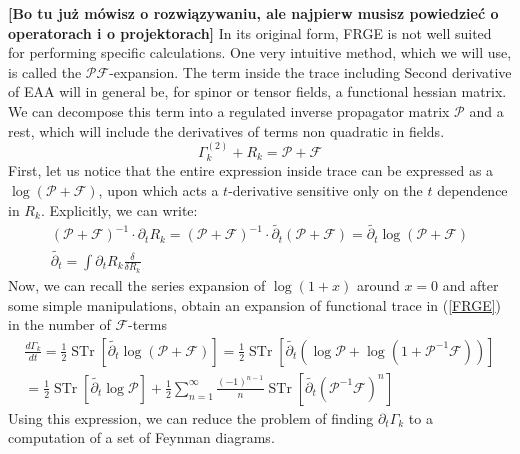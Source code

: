 \documentclass[11pt, a4paper]{article}
\newcommand{\jhkbf}[1]{\textbf{\color{red} [#1]}}
\begin{document}
\jhkbf{Bo tu już mówisz o rozwiązywaniu, ale najpierw musisz powiedzieć o operatorach i o projektorach}
In its original form, FRGE is not well suited for performing specific calculations. One very intuitive method, which
we will use, is called the $\mathcal{PF}$-expansion. 
The term inside the trace including Second derivative of EAA
will in general be, for spinor or tensor fields, a functional hessian matrix. We can decompose this term into a
regulated inverse propagator matrix $\mathcal{P}$ and a rest, which will include the derivatives of terms non quadratic in fields.
\begin{equation}
    \Gamma_k^{(2)} + R_k = \mathcal{P} + \mathcal{F}
    \label{pf1}
\end{equation}
First, let us notice that the entire expression inside trace can be expressed as a $\log{(\mathcal{P}+\mathcal{F})}$, upon which acts
a $t$-derivative sensitive only on the $t$ dependence in $R_k$. Explicitly, we can write:
\begin{gather}
    \left(\mathcal{P} + \mathcal{F}\right)^{-1} \cdot \partial_t R_k = \left(\mathcal{P} + \mathcal{F}\right)^{-1} \cdot \widetilde{\partial_t} \left(\mathcal{P}+\mathcal{F}\right) = \widetilde{\partial_t} \log{\left(\mathcal{P}+\mathcal{F}\right)}\\
    \widetilde{\partial_t} = \int \partial_t R_k \frac{\delta}{\delta R_k}
\end{gather}
Now, we can recall the series expansion of $\log{(1+x)}$ around $x=0$ and after some simple manipulations, obtain an expansion of functional trace in (\ref{FRGE}) in
the number of $\mathcal{F}$-terms
\begin{gather}
    \frac{d \Gamma_k}{dt} = \frac{1}{2} \operatorname{STr} \left[ \widetilde{\partial_t} \log{\left(\mathcal{P}+\mathcal{F}\right)} \right] = \frac{1}{2} \operatorname{STr} \left[ \widetilde{\partial_t} \left(\log{\mathcal{P}} + \log{(1+\mathcal{P}^{-1}\mathcal{F})}\right) \right] \\ =  \frac{1}{2} \operatorname{STr} \left[ \widetilde{\partial_t} \log{\mathcal{P}} \right] + \frac{1}{2} \sum_{n=1}^{\infty} \frac{(-1)^{n-1}}{n} \operatorname{STr}\left[\widetilde{\partial_t}\left(\mathcal{P}^{-1}\mathcal{F}\right)^n\right]
    \label{pf}
\end{gather}
Using this expression, we can reduce the problem of finding $\partial_t \Gamma_k$ to a computation of a set of Feynman diagrams.
\end{document}
